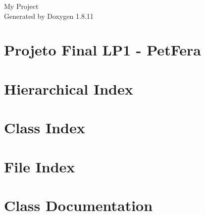 \documentclass[twoside]{book}
\newcommand{\+}{\discretionary{\mbox{\scriptsize$\hookleftarrow$}}{}{}}
\newcommand{\clearemptydoublepage}{%
  \newpage{\pagestyle{empty}\cleardoublepage}%
}
\begin{document}
\hypersetup{pageanchor=false,
             bookmarksnumbered=true,
             pdfencoding=unicode
            }
\begin{titlepage}
\vspace*{7cm}
\begin{center}%
{\Large My Project }\\
\vspace*{1cm}
{\large Generated by Doxygen 1.8.11}\\
\end{center}
\end{titlepage}
\clearemptydoublepage
\tableofcontents
\clearemptydoublepage
{}
\hypersetup{pageanchor=true}

\chapter{Projeto Final L\+P1 -\/ Pet\+Fera}
\label{md_README}
\hypertarget{md_README}{}

\chapter{Hierarchical Index}

\chapter{Class Index}

\chapter{File Index}

\chapter{Class Documentation}




















\end{document}
